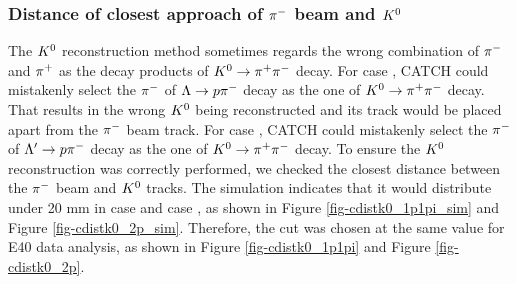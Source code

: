 \begin{comment}

\begin{figure}[!h]
  \begin{minipage}[t]{0.48\columnwidth}
    \centering
    \texttt{[image: thetapipi\_sim1.png]}
    \caption{Simulation of the opening angle between $\pM$ and $\pP$ derived from the $\kzdecay$ decay in case \rom{1}.}
    \label{fig-thetapipi_sim1}
  \end{minipage}
  \hspace{0.04\columnwidth} %
  \begin{minipage}[t]{0.48\columnwidth}
    \centering
    \texttt{[image: thetapipi\_sim2.png]}
    \caption{Simulation of the opening angle between $\pM$ and $\pP$ derived from the $\kzdecay$ decay in case \rom{2}.}
    \label{fig-thetapipi_sim2}
  \end{minipage}
\end{figure}


\begin{figure}[!h]
  \begin{minipage}[t]{0.48\columnwidth}
    \centering
    \texttt{[image: thetapipi\_1.png]}
    \caption{Opening angle between $\pM$ and $\pP$ derived from the $\kzdecay$ decay in case \rom{1}, taken in the E40 data.}
    \label{fig-thetapipi_1}
  \end{minipage}
  \hspace{0.04\columnwidth} %
  \begin{minipage}[t]{0.48\columnwidth}
    \centering
    \texttt{[image: thetapipi\_2.png]}
    \caption{Opening angle between $\pM$ and $\pP$ derived from the $\kzdecay$ decay in case \rom{2}, taken in the E40 data.}
    \label{fig-thetapipi_2}
  \end{minipage}
\end{figure}

\end{comment}


\subsubsection{Distance of closest approach of $\pi^{-}$ beam and $K^{0}$}
The $K^{0}$ reconstruction method sometimes regards the wrong combination of $\pi^{-}$ and $\pi^{+}$ as the decay products of $K^0 \to \pi^+ \pi^-$ decay. For case , CATCH could mistakenly select the $\pi^{-}$ of $\Lambda\to p\pi^{-}$ decay as the one of $K^0 \to \pi^+ \pi^-$ decay. That results in the wrong $K^{0}$ being reconstructed and its track would be placed apart from the $\pi^{-}$ beam track. For case , CATCH could mistakenly select the $\pi^{-}$ of $\Lambda'\to p\pi^{-}$ decay as the one of $K^0 \to \pi^+ \pi^-$ decay. 
To ensure the $K^{0}$ reconstruction was correctly performed, we checked the closest distance between the $\pi^{-}$ beam and $K^{0}$ tracks. The simulation indicates that it would distribute under 20 mm in case  and case , as shown in Figure \ref{fig-cdistk0_1p1pi_sim} and Figure \ref{fig-cdistk0_2p_sim}. Therefore, the cut was chosen at the same value for E40 data analysis, as shown in Figure \ref{fig-cdistk0_1p1pi} and Figure \ref{fig-cdistk0_2p}. 

